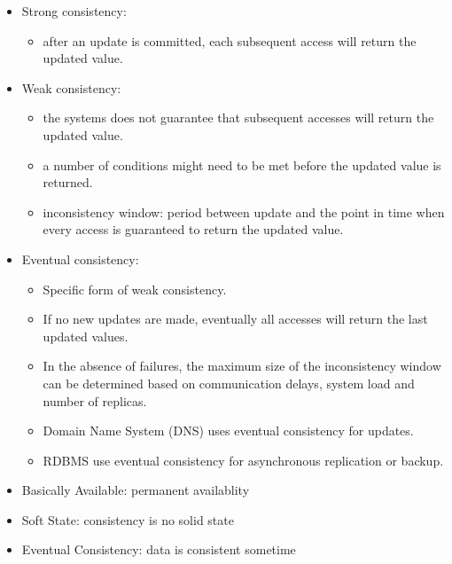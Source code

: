 \begin{breakbox}
\begin{itemize}
	\item Strong consistency:
		\begin{itemize}
			\item after an update is committed, each subsequent access will return the updated value.
		\end{itemize}
	\item Weak consistency:
		\begin{itemize}
			\item the systems does not guarantee that subsequent accesses will return the updated value.
			\item a number of conditions might need to be met before the updated value is returned.
			\item inconsistency window: period between update and the point in time when every access is guaranteed to return the updated value.
		\end{itemize}
	\item Eventual consistency:
		\begin{itemize}
			\item Specific form of weak consistency.
			\item If no new updates are made, eventually all accesses will return the last updated values.
			\item In the absence of failures, the maximum size of the inconsistency window can be determined based on communication delays, system load and number of replicas.
			\item Domain Name System (DNS) uses eventual consistency for updates.
			\item RDBMS use eventual consistency for asynchronous replication or backup.
		\end{itemize}
\end{itemize}
\end{breakbox}

\begin{breakbox}
\begin{itemize}
	\item \textcolor{Emerald}{B}asically \textcolor{Emerald}{A}vailable: permanent availablity
	\item \textcolor{Emerald}{S}oft State: consistency is no solid state
	\item \textcolor{Emerald}{E}ventual Consistency: data is consistent sometime
\end{itemize}
\end{breakbox}

